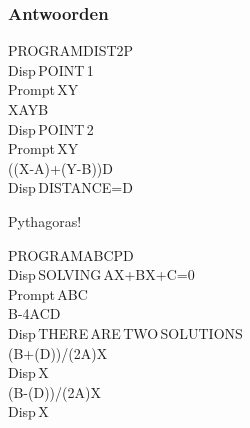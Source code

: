 \begin{frame}
\frametitle{Antwoorden}

\begin{ticalc}[4.2cm]
	PROGRAM\:DIST2P \\%
	\:Disp\,\qt POINT\,1\:\qt \\%
	\:Prompt\,X\comma Y \\%
	\:X\>A\:Y\>B \\%
	\:Disp\,\qt POINT\,2\:\qt \\%
	\:Prompt\,X\comma Y \\%
	\:\sqrt((X-A)\sq+(Y-B)\sq)\>D \\%
	\:Disp\,\qt DISTANCE=\qt\comma D%
\end{ticalc}
Pythagoras!

\vspace{0.3cm}

\begin{ticalc}[6.7cm]
	PROGRAM\:ABCPD \\%
	\:Disp\,\qt SOLVING\,AX\sq+BX+C=0\qt \\%
	\:Prompt\,A\comma B\comma C \\%
	\:B\sq-4AC\>D \\%
	\:Disp\,\qt THERE\,ARE\,TWO\,SOLUTIONS\:\qt \\%
	\:(\min B+\sqrt(D))/(2A)\>X \\%
	\:Disp\,X \\%
	\:(\min B-\sqrt(D))/(2A)\>X \\%
	\:Disp\,X%
\end{ticalc}

\end{frame}


